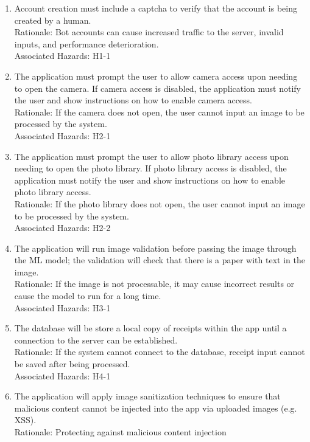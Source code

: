 \documentclass{article}
\begin{document}
\begin{enumerate}[label=SR\arabic*]
    \item Account creation must include a captcha to verify that the account is
    being created by a human.\\Rationale: Bot accounts can cause increased
    traffic to the server, invalid inputs, and performance deterioration.
    \\Associated Hazards: H1-1
    \item The application must prompt the user to allow camera access upon
    needing to open the camera. If camera access is disabled, the application
    must notify the user and show instructions on how to enable camera
    access.\\Rationale: If the camera does not open, the user cannot input an
    image to be processed by the system.\\Associated Hazards: H2-1
    \item The application must prompt the user to allow photo library access upon
    needing to open the photo library. If photo library access is disabled, the
    application must notify the user and show instructions on how to enable
    photo library access.\\Rationale: If the photo library does not open, the
    user cannot input an image to be processed by the system.\\Associated
    Hazards: H2-2
    \item The application will run image validation before passing the image
    through the ML model; the validation will check that there is a paper with
    text in the image.\\Rationale: If the image is not processable, it may cause
    incorrect results or cause the model to run for a long time.\\Associated
    Hazards: H3-1
    \item The database will be store a local copy of receipts within the app
    until a connection to the server can be established.\\Rationale: If the
    system cannot connect to the database, receipt input cannot be saved after
    being processed.\\Associated Hazards: H4-1 
    \item The application will apply image sanitization techniques to ensure
    that malicious content cannot be injected into the app via uploaded images
    (e.g. XSS). \\Rationale: Protecting against malicious content injection

\end{enumerate}
\end{document}
